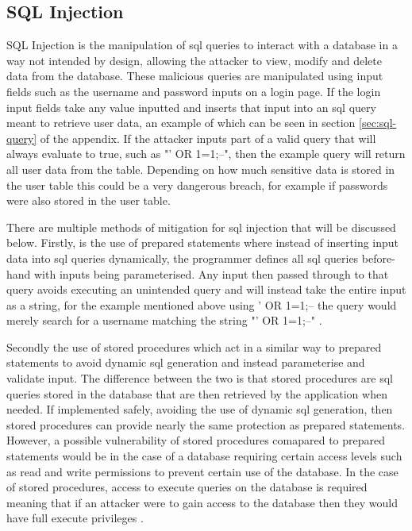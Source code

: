 \documentclass{ueacmpstyle}
\begin{document}
      \subsection{SQL Injection}\label{sub:SqlInjection}
      SQL Injection is the manipulation of sql queries to interact with a database in 
      a way not intended by design, allowing the attacker to view, modify and delete 
      data from the database. These malicious queries are manipulated using input 
      fields such as the username and password inputs on a login page. If the login 
      input fields take any value inputted and inserts that input into an sql query 
      meant to retrieve user data, an example of which can be seen in section 
      \ref{sec:sql-query} of the appendix. If the attacker inputs part of a valid query 
      that will always evaluate to true, such as "' OR 1=1;--", then the example query 
      will return all user data from the table. Depending on how much sensitive data 
      is stored in the user table this could be a very dangerous breach, for example 
      if passwords were also stored in the user table.

      There are multiple methods of mitigation for sql injection that will be discussed 
      below. Firstly, is the use of prepared statements where instead of inserting input 
      data into sql queries dynamically, the programmer defines all sql queries before-
      hand with inputs being parameterised. Any input then passed through to that query 
      avoids executing an unintended query and will instead take the entire input as a 
      string, for the example mentioned above using ' OR 1=1;-- the query would merely 
      search for a username matching the string "' OR 1=1;--" \citep{OWASPSqlInjectionPrevention}. 

      Secondly the use of stored procedures which act in a similar way to prepared 
      statements to avoid dynamic sql generation and instead parameterise and validate 
      input. The difference between the two is that stored procedures are sql queries 
      stored in the database that are then retrieved by the application when needed. 
      If implemented safely, avoiding the use of dynamic sql generation, then stored 
      procedures can provide nearly the same protection as prepared statements. 
      However, a possible vulnerability of stored procedures comapared to prepared 
      statements would be in the case of a database requiring certain access levels 
      such as read and write permissions to prevent certain use of the database. In 
      the case of stored procedures, access to execute queries on the database is 
      required meaning that if an attacker were to gain access to the database then 
      they would have full execute privileges \citep{OWASPSqlInjectionPrevention}.
\end{document}
